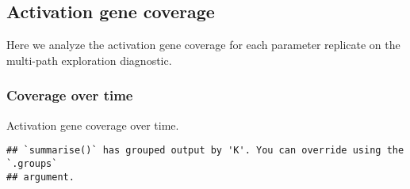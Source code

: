 \documentclass[]{book}
\newenvironment{Shaded}{\begin{snugshade}}{\end{snugshade}}
\newcommand{\DataTypeTok}[1]{\textcolor[rgb]{0.13,0.29,0.53}{#1}}
\newcommand{\KeywordTok}[1]{\textcolor[rgb]{0.13,0.29,0.53}{\textbf{#1}}}
\newcommand{\NormalTok}[1]{#1}
\newcommand{\OperatorTok}[1]{\textcolor[rgb]{0.81,0.36,0.00}{\textbf{#1}}}
\newcommand{\StringTok}[1]{\textcolor[rgb]{0.31,0.60,0.02}{#1}}
\begin{document}
\hypertarget{activation-gene-coverage-13}{%
\subsection{Activation gene coverage}\label{activation-gene-coverage-13}}

Here we analyze the activation gene coverage for each parameter replicate on the multi-path exploration diagnostic.

\hypertarget{coverage-over-time-19}{%
\subsubsection{Coverage over time}\label{coverage-over-time-19}}

Activation gene coverage over time.

\begin{Shaded}
\end{Shaded}

\begin{verbatim}
## `summarise()` has grouped output by 'K'. You can override using the `.groups`
## argument.
\end{verbatim}
\end{document}
